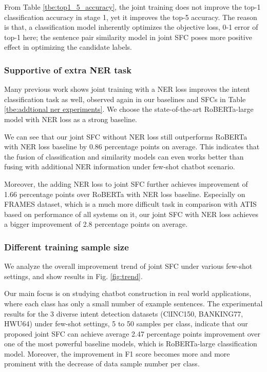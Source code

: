 From Table \ref{tbe:top1_5_accuracy}, the joint training does not improve the top-1 classification accuracy in stage 1, yet it improves the top-5 accuracy.
The reason is that, a classification model inherently optimizes the objective loss, 0-1 error of top-1 here; the sentence pair similarity model in joint SFC poses more positive effect in optimizing the candidate labels.

\subsubsection*{Supportive of extra NER task}
Many previous work shows joint training with a NER loss improves the intent classification task as well, observed again in our baselines and SFCs in Table \ref{tbe:addtional ner experiments}.
We choose the state-of-the-art RoBERTa-large model with NER loss as a strong baseline. 

We can see that our joint SFC without NER loss still outperforms RoBERTa with NER loss baseline by 0.86 percentage points on average. 
This indicates that the fusion of classification and similarity models can even works better than fusing with additional NER information under few-shot chatbot scenario. 

Moreover, the adding NER loss to joint SFC further achieves improvement of 1.66 percentage points over RoBERTa with NER loss baseline. 
Especially on FRAMES dataset, which is a much more difficult task in comparison with ATIS based on performance of all systems on it, our joint SFC with NER loss achieves a bigger improvement of 2.8 percentage points on average. 

\subsubsection*{Different training sample size} 
We analyze the overall improvement trend of joint SFC under various few-shot settings, and show results in Fig. \ref{fig:trend}.

Our main focus is on studying chatbot construction in real world applications, where each class has only a small number of example sentences.
The experimental results for the 3 diverse intent detection datasets (ClINC150, BANKING77, HWU64) under few-shot settings, 5 to 50 samples per class, indicate that our proposed joint SFC can achieve average 2.47 percentage points improvement over one of the most powerful baseline models, which is RoBERTa-large classification model. 
Moreover, the improvement in F1 score becomes more and more prominent with the decrease of data sample number per class.

